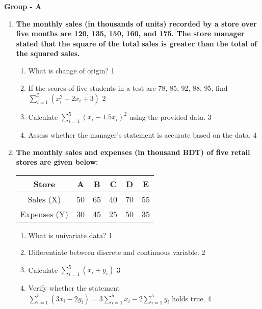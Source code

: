 \documentclass[12pt]{article}
\begin{document}
\begin{center}
\textbf{Group  - A}
\end{center}

  \begin{enumerate}
  
  \item
\textbf{The monthly sales (in thousands of units) recorded by a store over 
five months are 120, 135, 150, 160, and 175. The store manager 
stated that the square of the total sales is greater than the total of 
the squared sales.}

\begin{enumerate}
    \item  What is change of origin? \hfill 1
    \item 
    If the scores of five students in a test are 78, 85, 92, 88, 95, 
  find $\displaystyle \sum_{i=1}^5 (x_i^2 - 2x_i + 3)$ \hfill 2
   \item Calculate $\displaystyle \sum_{i=1}^5 (x_i - 1.5x_i)^2$ using the 
    provided data. \hfill 3
    \item
    Assess whether the manager’s statement is accurate based on the data. \hfill 4
\end{enumerate}

  \item
\textbf{The monthly sales and expenses (in thousand BDT) of five retail stores are given below:}

\begin{table}[h]
\centering
\begin{tabular}{c|ccccc}
Store & A & B & C & D & E \\ \hline
Sales (X) & 50 & 65 & 40 & 70 & 55 \\ \hline
Expenses (Y) & 30 & 45 & 25 & 50 & 35
\end{tabular}
\end{table}

\begin{enumerate}
\item What is univariate data? \hfill 1
\item Differentiate between discrete and continuous variable. \hfill 2
    \item 
    Calculate $\displaystyle \sum_{i=1}^5 (x_i + y_i)$ \hfill 3
    \item 
    Verify whether the statement $\displaystyle \sum_{i=1}^5 (3x_i - 2y_i) = 3 \sum_{i=1}^5 x_i - 2 \sum_{i=1}^5 y_i$ holds true. \hfill 4
\end{enumerate}



\end{enumerate}
\end{document}
